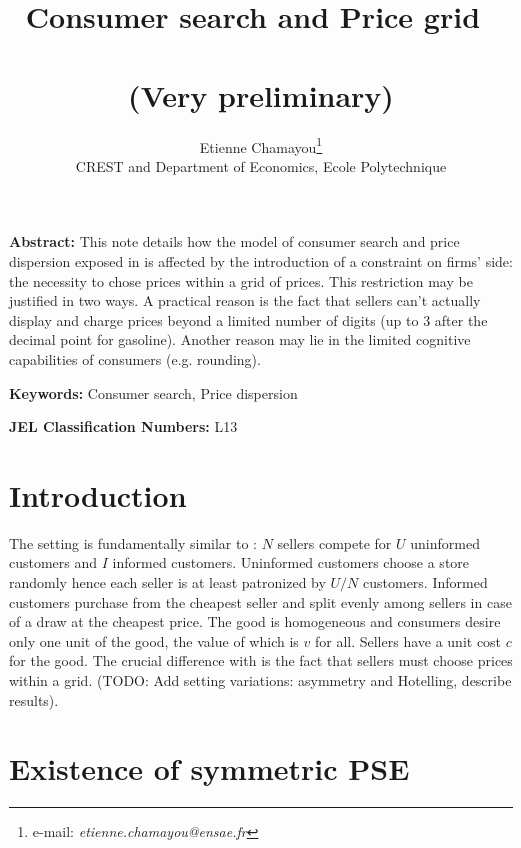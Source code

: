 \documentclass[11pt]{article}
\begin{document}
\title{Consumer search and Price grid\ \\ \ \\(Very preliminary)}
\author{Etienne Chamayou\thanks{e-mail:
\textit{etienne.chamayou@ensae.fr}}\medskip\\{\normalsize CREST and Department of Economics, Ecole Polytechnique }}
\maketitle

\sloppy%

\onehalfspacing

\textbf{Abstract:}
This note details how the model of consumer search and price dispersion exposed in \cite{VAR80} is affected by the introduction of a constraint on firms' side: the necessity to chose prices within a grid of prices. This restriction may be justified in two ways. A practical reason is the fact that sellers can't actually display and charge prices beyond a limited number of digits (up to 3 after the decimal point for gasoline). Another reason may lie in the limited cognitive capabilities of consumers (e.g. rounding).

\strut

\textbf{Keywords:} Consumer search, Price dispersion

\strut

\textbf{JEL Classification Numbers:} L13

\pagebreak%
\doublespacing

\section{Introduction}

The setting is fundamentally similar to \cite{VAR80}: $N$ sellers compete for $U$ uninformed customers and $I$ informed customers. Uninformed customers choose a store randomly hence each seller is at least patronized by $U/N$ customers. Informed customers purchase from the cheapest seller and split evenly among sellers in case of a draw at the cheapest price. The good is homogeneous and consumers desire only one unit of the good, the value of which is $v$ for all. Sellers have a unit cost $c$ for the good. The crucial difference with \cite{VAR80} is the fact that sellers must choose prices within a grid. (TODO: Add setting variations: asymmetry and Hotelling, describe results).

\section{Existence of symmetric PSE}
\end{document}
